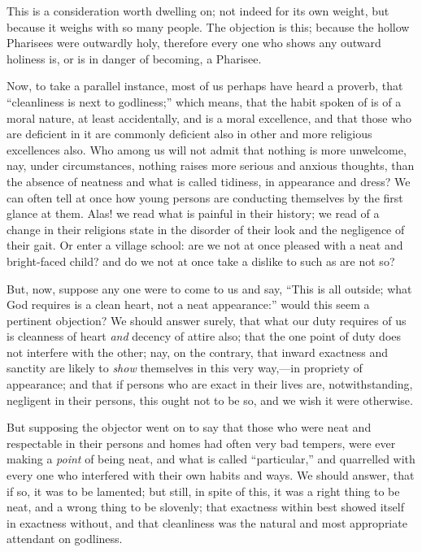This is a consideration worth dwelling on; not indeed for its own
weight, but because it weighs with so many people. The objection is
this; because the hollow Pharisees were outwardly holy, therefore
every one who shows any outward holiness is, or is in danger of
becoming, a Pharisee.

Now, to take a parallel instance, most of us perhaps have heard a
proverb, that ``cleanliness is next to godliness;'' which
means, that the habit spoken of is of a moral nature, at least
accidentally, and is a moral excellence, and that those who are
deficient in it are commonly deficient also in other and more
religious excellences also. Who among us will not admit that nothing
is more unwelcome, nay, under circumstances, nothing raises more
serious and anxious thoughts, than the absence of neatness and what is
called tidiness, in appearance and dress? We can often tell at once
how young persons are conducting themselves by the first glance at
them. Alas! we read what is painful in their history; we read of a
change in their religions state in the disorder of their look and the
negligence of their gait. Or enter a village school: are we not at
once pleased with a neat and bright-faced child? and do we not at once
take a dislike to such as are not so?

But, now, suppose any one were to come to us and say, ``This is
all outside; what God requires is a clean heart, not a neat
appearance:'' would this seem a pertinent objection? We should
answer surely, that what our duty requires of us is cleanness of heart
\emph{and} decency of attire also; that the one point of duty does not
interfere with the other; nay, on the contrary, that inward exactness
and sanctity are likely to \emph{show} themselves in this very way,—in
propriety of appearance; and that if persons who are exact in their
lives are, notwithstanding, negligent in their persons, this ought not
to be so, and we wish it were otherwise.

But supposing the objector went on to say that those who were neat
and respectable in their persons and homes had often very bad tempers,
were ever making a \emph{point} of being neat, and what is called
``particular,'' and quarrelled with every one who interfered
with their own habits and ways. We should answer, that if so, it was
to be lamented; but still, in spite of this, it was a right thing to
be neat, and a wrong thing to be slovenly; that exactness within best
showed itself in exactness without, and that cleanliness was the
natural and most appropriate attendant on godliness.

